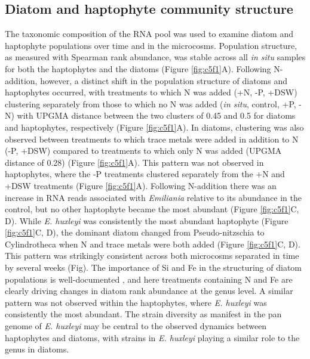 \subsection{Diatom and haptophyte community structure}

The taxonomic composition of the RNA pool was used to examine diatom and haptophyte populations over time and in the microcosms. Population structure, as measured with Spearman rank abundance, was stable across all \textit{in situ} samples for both the haptophytes and the diatoms (Figure \ref{fig:c5f1}A). Following N-addition, however, a distinct shift in the population structure of diatoms and haptophytes occurred, with treatments to which N was added (+N, -P, +DSW) clustering separately from those to which no N was added (\textit{in situ}, control, +P, -N) with UPGMA distance between the two clusters of 0.45 and 0.5 for diatoms and haptophytes, respectively (Figure \ref{fig:c5f1}A). In diatoms, clustering was also observed between treatments to which trace metals were added in addition to N (-P, +DSW) compared to treatments to which only N was added (UPGMA distance of 0.28) (Figure \ref{fig:c5f1}A). This pattern was not observed in haptophytes, where the -P treatments clustered separately from the +N and +DSW treatments (Figure \ref{fig:c5f1}A). Following N-addition there was an increase in RNA reads associated with \textit{Emiliania} relative to its abundance in the control, but no other haptophyte became the most abundant (Figure \ref{fig:c5f1}C, D). While \textit{E. huxleyi} was consistently the most abundant haptophyte (Figure \ref{fig:c5f1}C, D), the dominant diatom changed from Pseudo-nitzschia to Cylindrotheca when N and trace metals were both added (Figure \ref{fig:c5f1}C, D). This pattern was strikingly consistent across both microcosms separated in time by several weeks (Fig). The importance of Si and Fe in the structuring of diatom populations is well-documented \citep{Marchetti2005, Marchetti2012a}, and here treatments containing N and Fe are clearly driving changes in diatom rank abundance at the genus level. A similar pattern was not observed within the haptophytes, where \textit{E. huxleyi} was consistently the most abundant. The strain diversity as manifest in the pan genome of \textit{E. huxleyi} \citep{Read2013} may be central to the observed dynamics between haptophytes and diatoms, with strains in \textit{E. huxleyi} playing a similar role to the genus in diatoms.\par

